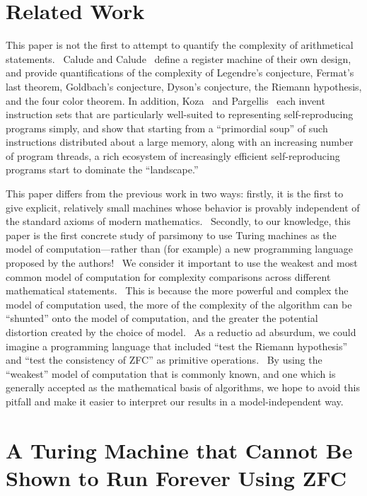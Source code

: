 \documentclass[11pt]{article}
\begin{document}
\section{Related Work}

This paper is not the first to attempt to quantify the complexity of arithmetical statements. \ Calude and Calude~\cite{calude} define a register machine of their own design, and provide quantifications of the complexity of Legendre's conjecture, Fermat's last theorem, Goldbach's conjecture, Dyson's conjecture, the Riemann hypothesis, and the four color theorem.\footnotemark
{}
In addition, Koza~\cite{koza} and Pargellis~\cite{pargellis} each invent instruction sets that are particularly well-suited to representing self-reproducing programs simply, and show that starting from a ``primordial soup'' of such instructions distributed about a large memory, along with an increasing number of program threads, a rich ecosystem of increasingly efficient self-reproducing programs start to dominate the ``landscape.''

This paper differs from the previous work in two ways: firstly, it is the first to give explicit, relatively small machines whose behavior is provably independent of the standard axioms of modern mathematics. \ Secondly, to our knowledge, this paper is the first concrete study of parsimony to use Turing machines as the model of computation---rather than (for example) a new programming language proposed by the authors! \ We consider it important to use the weakest and most common model of computation for complexity comparisons across different mathematical statements. \ This is because the more powerful and complex the model of computation used, the more of the complexity of the algorithm can be ``shunted'' onto the model of computation, and the greater the potential distortion created by the choice of model. \ As a reductio ad absurdum, we could imagine a programming language that included ``test the Riemann hypothesis'' and ``test the consistency of ZFC'' as primitive operations. \ By using the ``weakest'' model of computation that is commonly known, and one which is generally accepted as the mathematical basis of algorithms, we hope to avoid this pitfall and make it easier to interpret our results in a model-independent way.


\section{A Turing Machine that Cannot Be Shown to Run Forever Using ZFC}
\end{document}
